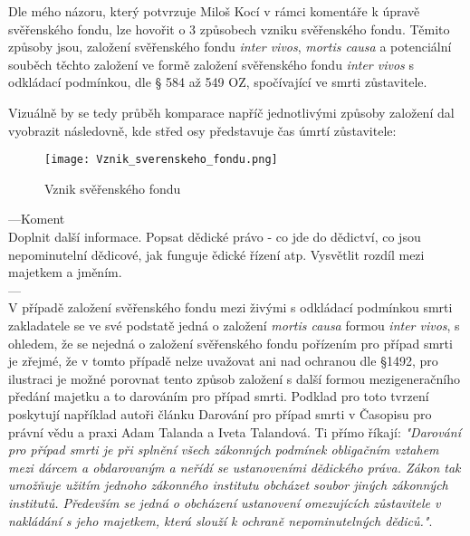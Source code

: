 \documentclass{article}
\begin{document}
Dle mého názoru, který potvrzuje Miloš Kocí v rámci komentáře k úpravě svěřenského fondu, lze hovořit o 3 způsobech vzniku svěřenského fondu. Těmito způsoby jsou, založení svěřenského fondu \textit{inter vivos}, \textit{mortis causa} a potenciální souběch těchto založení ve formě založení svěřenského fondu \textit{inter vivos} s odkládací podmínkou, dle § 584 až 549 OZ, spočívající ve smrti zůstavitele. \\

\newpage

\thispagestyle{smallertextinheader}

Vizuálně by se tedy průběh komparace napříč jednotlivými způsoby založení dal vyobrazit následovně, kde střed osy představuje čas úmrtí zůstavitele:

\begin{figure}[h]
\centering
\texttt{[image: Vznik\_sverenskeho\_fondu.png]}
\caption{Vznik svěřenského fondu}
\label{fig:komparace}
\end{figure}

---Koment\\
Doplnit další informace.
Popsat dědické právo - co jde do dědictví, co jsou nepominutelní dědicové, jak funguje ědické řízení atp.
Vysvětlit rozdíl mezi majetkem a jměním.\\
---\\

V případě založení svěřenského fondu mezi živými s odkládací podmínkou smrti zakladatele se ve své podstatě jedná o založení \textit{mortis causa} formou \textit{inter vivos}, s ohledem, že se nejedná o založení svěřenského fondu pořízením pro případ smrti je zřejmé, že v tomto případě nelze uvažovat ani nad ochranou dle §1492, pro ilustraci je možné porovnat tento způsob založení s další formou mezigeneračního předání majetku a to darováním pro případ smrti. Podklad pro toto tvrzení poskytují například autoři článku Darování pro případ smrti v Časopisu pro právní vědu a praxi Adam Talanda a Iveta Talandová. Ti přímo říkají: \textit{"Darování pro případ smrti je při splnění všech zákonných podmínek obligačním vztahem mezi dárcem a obdarovaným a neřídí se ustanoveními dědického práva. Zákon tak umožňuje užitím jednoho zákonného institutu obcházet soubor jiných zákonných institutů. Především se jedná o obcházení ustanovení omezujících zůstavitele v nakládání s jeho majetkem, která slouží k ochraně nepominutelných dědiců."}.
\end{document}
